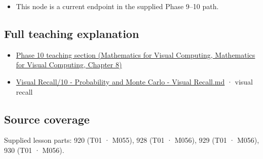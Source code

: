 \begin{itemize}
\tightlist
\item
  This node is a current endpoint in the supplied Phase 9--10 path.
\end{itemize}

\subsection{Full teaching explanation}\label{appendix-f0437ea55a47-full-teaching-explanation}

\begin{itemize}
\tightlist
\item
  \href{../02-Mathematics-for-Visual-Computing/main.pdf\#nameddest=02-foundations-ii-ch024-waiting-times-event-counts-and-covariance-geometry}{Phase 10 teaching section (Mathematics for Visual Computing, Mathematics for Visual Computing, Chapter 8)}
\item
  \hyperref[appendix-cb5af353ef77]{Visual Recall/10 - Probability and Monte Carlo - Visual Recall.md} · visual recall
\end{itemize}

\subsection{Source coverage}\label{appendix-f0437ea55a47-source-coverage}

Supplied lesson parts: 920 (T01 · M055), 928 (T01 · M056), 929 (T01 · M056), 930 (T01 · M056).
